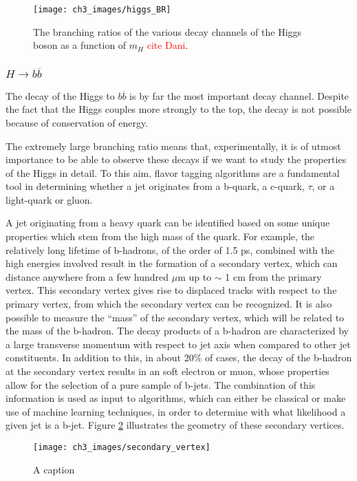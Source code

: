 \documentclass[10pt,a4paper]{book}
\newcommand\todo[1]{\textcolor{red}{#1}}
\begin{document}
\begin{figure}
\centering
\texttt{[image: ch3\_images/higgs\_BR]}
\caption{The branching ratios of the various decay channels of the Higgs boson as a function of $m_H$ \todo{cite Dani}.}
\label{Higgs branching ratios}
\end{figure}

\subsubsection{$H\rightarrow b\overline{b}$}

The decay of the Higgs to $b\overline{b}$ is by far the most important decay channel. Despite the fact that the Higgs couples more strongly to the top, the decay is not possible because of conservation of energy. 

The extremely large branching ratio means that, experimentally, it is of utmost importance to be able to observe these decays if we want to study the properties of the Higgs in detail. To this aim, flavor tagging algorithms are a fundamental tool in determining whether a jet originates from a b-quark, a c-quark, $\tau$, or a light-quark or gluon. 

A jet originating from a heavy quark can be identified based on some unique properties which stem from the high mass of the quark. For example, the relatively long lifetime of b-hadrons, of the order of 1.5 ps, combined with the high energies involved result in the formation of a secondary vertex, which can distance anywhere from a few hundred $\mu$m up to $\sim$ 1 cm from the primary vertex. This secondary vertex gives rise to displaced tracks with respect to the primary vertex, from which the secondary vertex can be recognized. It is also possible to measure the ``mass'' of the secondary vertex, which will be related to the mass of the b-hadron. The decay products of a b-hadron are characterized by a large transverse momentum with respect to jet axis when compared to other jet constituents. In addition to this, in about 20\% of cases, the decay of the b-hadron at the secondary vertex results in an soft electron or muon, whose properties allow for the selection of a pure sample of b-jets. The combination of this information is used as input to algorithms, which can either be classical or make use of machine learning techniques, in order to determine with what likelihood a given jet is a b-jet. Figure \ref{secondary vertex} illustrates the geometry of these secondary vertices.
\begin{figure}
\centering
\texttt{[image: ch3\_images/secondary\_vertex]}
\caption{A caption \cite{CMS:2017wtu}}
\label{secondary vertex}
\end{figure}
\end{document}
